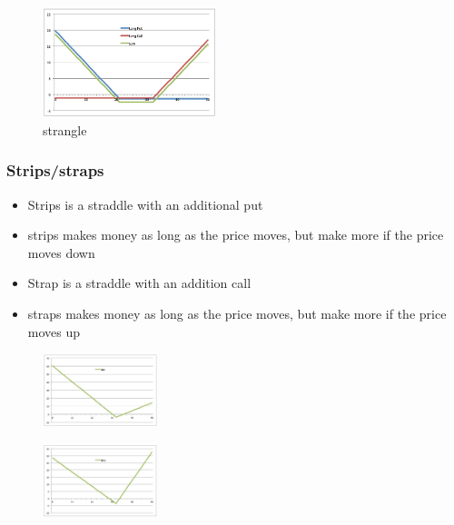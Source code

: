 \begin{multicols}{2}
\begin{figure}[H]
    \centering 
    \includegraphics[width =0.45\textwidth]{Figure/strangle.png}
    \caption*{strangle}
\end{figure}
\subsubsection{Strips/straps}
\begin{itemize}
    \item Strips is a straddle with an additional put 
    \item strips makes money as long as the price moves, but make more if the price moves down 
    \item Strap is a straddle with an addition call
    \item straps makes money as long as the price moves, but make more if the price moves up
\end{itemize}

\begin{figure}[H]
    \centering 
    \includegraphics[width =0.3\textwidth]{Figure/strip.png}
\end{figure}
\begin{figure}[H]
    \centering 
    \includegraphics[width =0.3\textwidth]{Figure/strap.png}
\end{figure}


\end{multicols}
